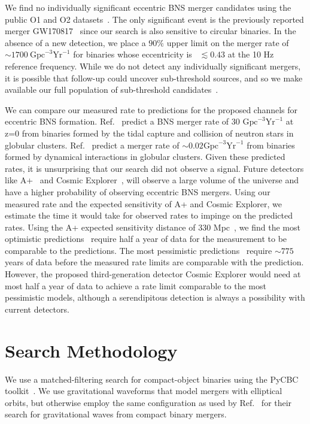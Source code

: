 We find no individually significant eccentric BNS merger candidates using the public O1 and O2 datasets~\cite{Vallisneri:2014vxa}. The only significant event is the previously reported merger GW170817~\cite{TheLIGOScientific:2017qsa} since our search is also sensitive to circular binaries. In the absence of a new detection, we place a $90\%$ upper limit on the merger rate of $\sim 1700~\textrm{Gpc}^{-3}\textrm{Yr}^{-1}$ for binaries whose eccentricity is \ecc~$\lesssim0.43$ at the 10 Hz reference frequency. While we do not detect any individually significant mergers, it is possible that follow-up could uncover sub-threshold sources, and so we make available our full population of sub-threshold candidates~\cite{1-ECCBNS}.

We can compare our measured rate to predictions for the proposed channels for eccentric BNS formation. Ref.~\cite{Lee:2009ca} predict a BNS merger rate of 30 $\textrm{Gpc}^{-3} \textrm{Yr}^{-1}$ at z=0 from binaries formed by the tidal capture and collision of neutron stars in globular clusters. Ref.~\cite{Ye:2019xvf} predict a merger rate of $\sim 0.02 \textrm{Gpc}^{-3} \textrm{Yr}^{-1}$ from binaries formed by dynamical interactions in globular clusters. Given these predicted rates, it is unsurprising that our search did not observe a signal. Future detectors like A+~\cite{Aasi:2013wya} and Cosmic Explorer~\cite{Reitze:2019iox}, will observe a large volume of the universe and have a higher probability of observing eccentric BNS mergers. Using our measured rate and the expected sensitivity of A+ and Cosmic Explorer, we estimate the time it would take for observed rates to impinge on the predicted rates. Using the A+ expected sensitivity distance of 330 Mpc~\cite{Aasi:2013wya}, we find the most optimistic predictions~\cite{Lee:2009ca} require half a year of data for the measurement to be comparable to the predictions. The most pessimistic predictions~\cite{Ye:2019xvf}  require $\sim 775$ years of data before the measured rate limits are comparable with the prediction. However, the proposed third-generation detector Cosmic Explorer would need at most half a year of data to achieve a rate limit comparable to the most pessimistic models, although a serendipitous detection is always a possibility with  current detectors.

\section{Search Methodology}   

We use a matched-filtering search for compact-object binaries  using the PyCBC toolkit~\cite{pycbc-github}. We use gravitational waveforms that model mergers with elliptical orbits, but otherwise employ the same configuration as used by Ref.~\cite{Nitz:2018imz} for their search for gravitational waves from compact binary mergers.

